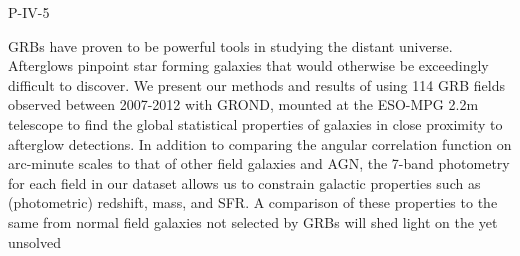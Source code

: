 P-IV-5


\bigskip



\bigskip

\noindent GRBs have proven to be powerful tools in studying the distant universe. Afterglows pinpoint star forming galaxies that would otherwise be  exceedingly difficult to discover. We present our methods and results of using 114 GRB fields observed between 2007-2012 with GROND, mounted at the ESO-MPG 2.2m telescope to find the global statistical properties of galaxies in close proximity to afterglow detections. In addition to comparing the angular correlation function on arc-minute scales to that of other field galaxies and AGN, the 7-band photometry for each field in our dataset allows us to constrain galactic properties such as (photometric) redshift, mass, and SFR. A comparison of these properties to the same from  normal field galaxies not selected by GRBs will shed light on the yet unsolved

